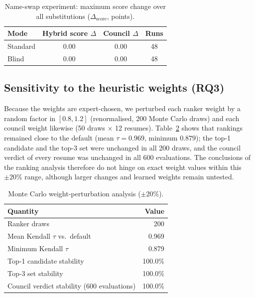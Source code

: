 \documentclass[conference]{IEEEtran}
\begin{document}
\begin{table}[t]
\caption{Name-swap experiment: maximum score change over all substitutions ($\Delta_{\mathrm{score}}$, points).}
\label{tab:nameswap}
\centering
\footnotesize
\begin{tabular}{@{}lccc@{}}
\toprule
Mode & Hybrid score $\Delta$ & Council $\Delta$ & Runs \\
\midrule
Standard & 0.00 & 0.00 & 48 \\
Blind    & 0.00 & 0.00 & 48 \\
\bottomrule
\end{tabular}
\end{table}

\subsection{Sensitivity to the heuristic weights (RQ3)}
Because the weights are expert-chosen, we perturbed each ranker weight by a random factor in $[0.8,1.2]$ (renormalised, 200 Monte Carlo draws) and each council weight likewise (50 draws $\times$ 12 resumes). Table~\ref{tab:sens} shows that rankings remained close to the default (mean $\tau=0.969$, minimum $0.879$); the top-1 candidate and the top-3 set were unchanged in all 200 draws, and the council verdict of every resume was unchanged in all 600 evaluations. The conclusions of the ranking analysis therefore do not hinge on exact weight values within this $\pm20\%$ range, although larger changes and learned weights remain untested.

\begin{table}[t]
\caption{Monte Carlo weight-perturbation analysis ($\pm20\%$).}
\label{tab:sens}
\centering
\footnotesize
\begin{tabular}{@{}lr@{}}
\toprule
Quantity & Value \\
\midrule
Ranker draws & 200 \\
Mean Kendall $\tau$ vs.\ default & 0.969 \\
Minimum Kendall $\tau$ & 0.879 \\
Top-1 candidate stability & 100.0\% \\
Top-3 set stability & 100.0\% \\
Council verdict stability (600 evaluations) & 100.0\% \\
\bottomrule
\end{tabular}
\end{table}
\end{document}
